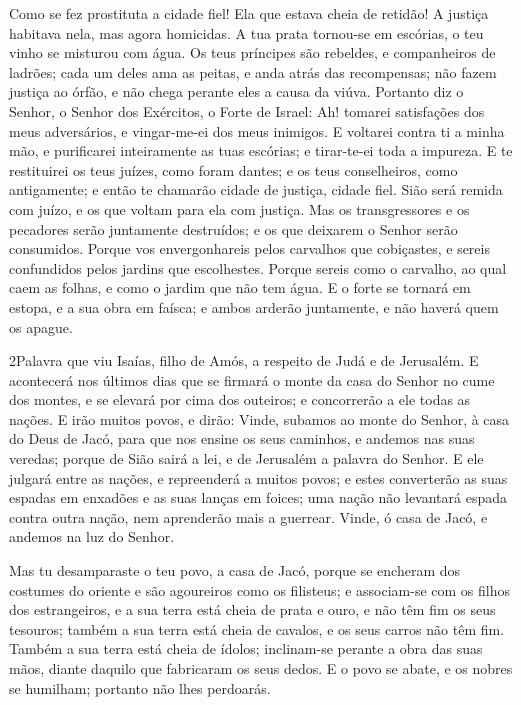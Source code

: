 Como se fez prostituta a cidade fiel! Ela que estava cheia de
retidão! A justiça habitava nela, mas agora homicidas. A tua
prata tornou-se em escórias, o teu vinho se misturou com água.
Os teus príncipes são rebeldes, e companheiros de ladrões;
cada um deles ama as peitas, e anda atrás das recompensas; não fazem
justiça ao órfão, e não chega perante eles a causa da viúva.
Portanto diz o Senhor, o Senhor dos Exércitos, o Forte de
Israel: Ah! tomarei satisfações dos meus adversários, e vingar-me-ei
dos meus inimigos. E voltarei contra ti a minha mão, e
purificarei inteiramente as tuas escórias; e tirar-te-ei toda a
impureza. E te restituirei os teus juízes, como foram dantes;
e os teus conselheiros, como antigamente; e então te chamarão cidade
de justiça, cidade fiel. Sião será remida com juízo, e os que
voltam para ela com justiça. Mas os transgressores e os
pecadores serão juntamente destruídos; e os que deixarem o Senhor
serão consumidos. Porque vos envergonhareis pelos carvalhos
que cobiçastes, e sereis confundidos pelos jardins que escolhestes.
Porque sereis como o carvalho, ao qual caem as folhas, e como
o jardim que não tem água. E o forte se tornará em estopa, e
a sua obra em faísca; e ambos arderão juntamente, e não haverá quem
os apague.

\medskip

\lettrine{2}{}Palavra que viu Isaías, filho de Amós, a respeito
de Judá e de Jerusalém. E acontecerá nos últimos dias que se
firmará o monte da casa do Senhor no cume dos montes, e se elevará
por cima dos outeiros; e concorrerão a ele todas as nações. E
irão muitos povos, e dirão: Vinde, subamos ao monte do Senhor, à
casa do Deus de Jacó, para que nos ensine os seus caminhos, e
andemos nas suas veredas; porque de Sião sairá a lei, e de Jerusalém
a palavra do Senhor. E ele julgará entre as nações, e
repreenderá a muitos povos; e estes converterão as suas espadas em
enxadões e as suas lanças em foices; uma nação não levantará espada
contra outra nação, nem aprenderão mais a guerrear. Vinde, ó
casa de Jacó, e andemos na luz do Senhor.

Mas tu desamparaste o teu povo, a casa de Jacó, porque se encheram
dos costumes do oriente e são agoureiros como os filisteus; e
associam-se com os filhos dos estrangeiros, e a sua terra está
cheia de prata e ouro, e não têm fim os seus tesouros; também a sua
terra está cheia de cavalos, e os seus carros não têm fim.
Também a sua terra está cheia de ídolos; inclinam-se perante a
obra das suas mãos, diante daquilo que fabricaram os seus dedos.
E o povo se abate, e os nobres se humilham; portanto não lhes
perdoarás.

